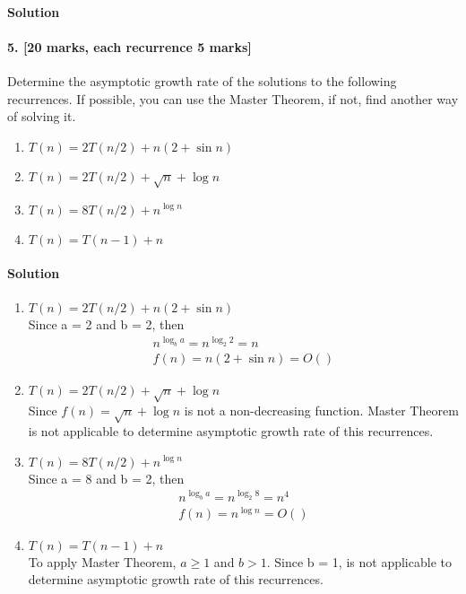 \documentclass[a4paper]{scrartcl}
\begin{document}
\paragraph{Solution}


\paragraph{5. [20 marks, each recurrence 5 marks]}
\label{sec:Question 5}
Determine the asymptotic growth rate of the solutions to the following recurrences. If possible, you can use the Master Theorem, if not, find another way of solving it.
\begin{enumerate}[label=(\alph*)]
  \item $T (n) = 2T (n/2) + n(2 + \sin{n})$
  \item $T (n) = 2T (n/2) + \sqrt{n} + \log{n}$
  \item $T (n) = 8T (n/2) + n^{\log{n}}$
  \item $T (n) = T (n − 1) + n$
\end{enumerate}
\paragraph{Solution}
\begin{enumerate}[label=(\alph*)]
  \item $T (n) = 2T (n/2) + n(2 + \sin{n})$\\
  Since a = 2 and b = 2, then
  \begin{align}
  n^{\log_b{a}} = n^{\log_2{2}} = n\\
  f(n) = n(2 + \sin{n}) = O()
  \end{align}

  \item $T (n) = 2T (n/2) + \sqrt{n} + \log{n}$\\
  Since $f(n) = \sqrt{n} + \log{n}$ is not a non-decreasing function. Master Theorem is not applicable to determine asymptotic growth rate of this recurrences.

  \item $T (n) = 8T (n/2) + n^{\log{n}}$\\
  Since a = 8 and b = 2, then
  \begin{align}
  n^{\log_b{a}} = n^{\log_2{8}} = n^4\\
  f(n) = n^{\log{n}} = O()
  \end{align}
  \item $T (n) = T (n - 1) + n$\\
  To apply Master Theorem, $a \geq 1$ and $b > 1$. Since b = 1, is not applicable to determine asymptotic growth rate of this recurrences.
\end{enumerate}
\end{document}
